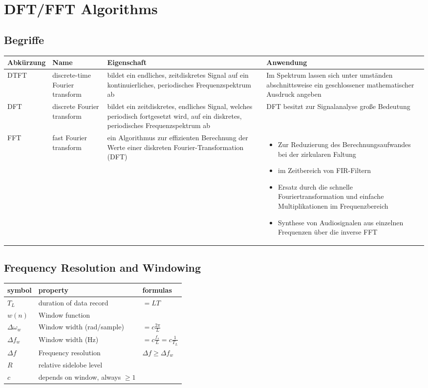 \section{DFT/FFT Algorithms}
\subsection{Begriffe}

\begin{tabularx}{\textwidth}{l p{3cm}XX}
Abkürzung & Name  & Eigenschaft & Anwendung \\\hline
DTFT & discrete-time Fourier transform & bildet ein endliches, zeitdiskretes Signal auf ein kontinuierliches, periodisches Frequenzspektrum ab & Im Spektrum lassen sich unter umständen  abschnittsweise ein geschlossener mathematischer Ausdruck angeben\\
DFT & discrete Fourier transform & bildet ein zeitdiskretes, endliches Signal, welches periodisch fortgesetzt wird, auf ein diskretes, periodisches Frequenzspektrum ab & DFT besitzt zur Signalanalyse große Bedeutung\\
FFT & fast Fourier transform & ein Algorithmus zur effizienten Berechnung der Werte einer diskreten Fourier-Transformation (DFT) &
\vspace{-19pt}
\begin{itemize}
\item Zur Reduzierung des Berechnungsaufwandes bei der zirkularen Faltung
\item im Zeitbereich von FIR-Filtern
\item Ersatz durch die schnelle Fouriertransformation und einfache Multiplikationen im Frequenzbereich
\item Synthese von Audiosignalen aus einzelnen Frequenzen über die inverse FFT
\end{itemize}\\
\end{tabularx}

\subsection{Frequency Resolution and Windowing}
\begin{tabular}{|l|l|l|}
	\hline
	symbol & property & formulas
	\\ \hline
	$T_L$ & duration of data record & $ = LT$
	\\ \hline
	$w(n)$ & Window function &
	\\ \hline
	$\Delta \omega_w$ & Window width (rad/sample) & $ = c \frac{2 \pi}{L}$
	\\ \hline
	$\Delta f_w$ & Window width (Hz) & $ = c \frac{f_s}{L} = c \frac{1}{T_L} $
	\\ \hline
	$\Delta f$ & Frequency resolution & $ \Delta f \geq \Delta f_w$
	\\ \hline
	$R$ & relative sidelobe level &
	\\ \hline
	$c$ & depends on window, always $\geq 1$ &
	\\ \hline
\end{tabular}


